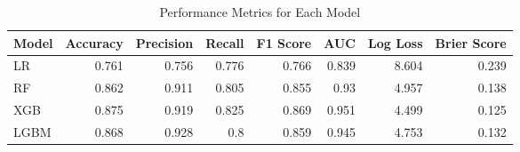 \begin{table}[H]\centering
\caption{Performance Metrics for Each Model}
\label{Table 3 :performance_metrics}
\begin{tabular}{lrrrrrrr}
\toprule
Model & Accuracy & Precision & Recall & F1 Score & AUC & Log Loss & Brier Score \\
\midrule
LR & 0.761 & 0.756 & 0.776 & 0.766 & 0.839 & 8.604 & 0.239 \\
RF & 0.862 & 0.911 & 0.805 & 0.855 & 0.93 & 4.957 & 0.138 \\
XGB & 0.875 & 0.919 & 0.825 & 0.869 & 0.951 & 4.499 & 0.125 \\
LGBM & 0.868 & 0.928 & 0.8 & 0.859 & 0.945 & 4.753 & 0.132 \\
\bottomrule
\end{tabular}
\end{table}
